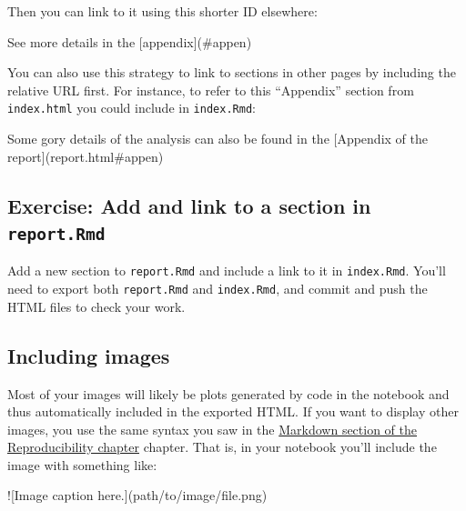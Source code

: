 \documentclass[]{Nemilov}
\newenvironment{Shaded}{\begin{snugshade}}{\end{snugshade}}
\newcommand{\AlertTok}[1]{\textcolor[rgb]{0.94,0.16,0.16}{#1}}
\newcommand{\NormalTok}[1]{#1}
\newcommand{\OtherTok}[1]{\textcolor[rgb]{0.56,0.35,0.01}{#1}}
\begin{document}
Then you can link to it using this shorter ID elsewhere:

\begin{Shaded}
\begin{Highlighting}[]
\NormalTok{See more details in the }\OtherTok{[appendix](#appen)}
\end{Highlighting}
\end{Shaded}

You can also use this strategy to link to sections in other pages by including the relative URL first.
For instance,
to refer to this ``Appendix'' section from \texttt{index.html} you could include in \texttt{index.Rmd}:

\begin{Shaded}
\begin{Highlighting}[]
\NormalTok{Some gory details of the analysis can also be found in the }\OtherTok{[Appendix of the report](report.html#appen)}
\end{Highlighting}
\end{Shaded}

\hypertarget{exercise-add-and-link-to-a-section-in-report.rmd}{%
\subsection{\texorpdfstring{Exercise: Add and link to a section in \texttt{report.Rmd}}{Exercise: Add and link to a section in report.Rmd}}\label{exercise-add-and-link-to-a-section-in-report.rmd}}

Add a new section to \texttt{report.Rmd} and include a link to it in \texttt{index.Rmd}.
You'll need to export both \texttt{report.Rmd} and \texttt{index.Rmd},
and commit and push the HTML files to check your work.

\hypertarget{including-images}{%
\subsection{Including images}\label{including-images}}

Most of your images will likely be plots generated by code in the notebook
and thus automatically included in the exported HTML.
If you want to display other images,
you use the same syntax you saw in the \protect\hyperlink{r-reproducibility-markdown}{Markdown section of the Reproducibility chapter} chapter.
That is,
in your notebook you'll include the image with something like:

\begin{Shaded}
\begin{Highlighting}[]
\AlertTok{![Image caption here.](path/to/image/file.png)}
\end{Highlighting}
\end{Shaded}
\end{document}
